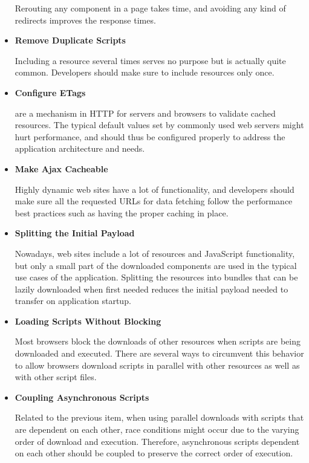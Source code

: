 \begin{itemize}
  Rerouting any component in a page takes time, and avoiding any kind
  of redirects improves the response times.

\item \textbf{Remove Duplicate Scripts}

  Including a resource several times serves no purpose but is actually
  quite common. Developers should make sure to include resources only
  once.

\item \textbf{Configure ETags}

   are a mechanism in HTTP for servers and browsers to
  validate cached resources. The typical default values set by
  commonly used web servers might hurt performance, and should thus be
  configured properly to address the application architecture and
  needs.

\item \textbf{Make Ajax Cacheable}

  Highly dynamic web sites have a lot of 
  \cite{garrett2005ajax} functionality, and developers should make
  sure all the requested URLs for data fetching follow the performance
  best practices such as having the proper caching in place.


\item \textbf{Splitting the Initial Payload}

  Nowadays, web sites include a lot of resources and JavaScript
  functionality, but only a small part of the downloaded components
  are used in the typical use cases of the application. Splitting the
  resources into bundles that can be lazily downloaded when first
  needed reduces the initial payload needed to transfer on application
  startup.

\item \textbf{Loading Scripts Without Blocking}

  Most browsers block the downloads of other resources when scripts
  are being downloaded and executed. There are several ways to
  circumvent this behavior to allow browsers download scripts in
  parallel with other resources as well as with other script files.

\item \textbf{Coupling Asynchronous Scripts}

  Related to the previous item, when using parallel downloads with
  scripts that are dependent on each other, race conditions might
  occur due to the varying order of download and execution. Therefore,
  asynchronous scripts dependent on each other should be coupled to
  preserve the correct order of execution.


\end{itemize}
